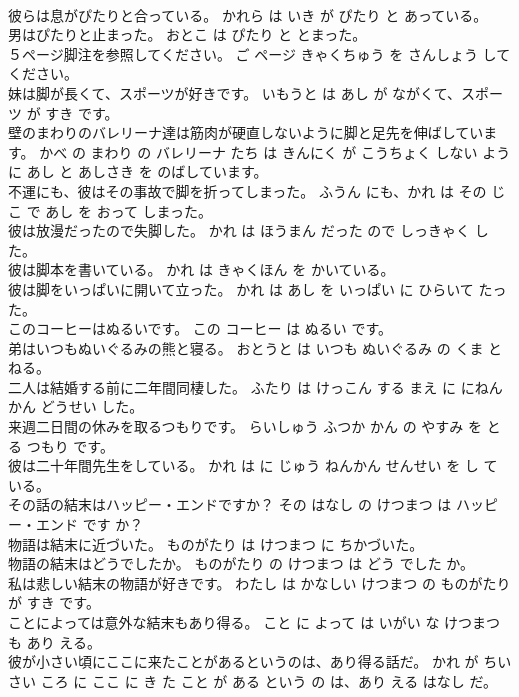 \documentclass[8pt]{extreport}
\begin{document}
\begin{CJK}{UTF8}{min}
\\	彼らは息がぴたりと合っている。	かれら は いき が ぴたり と あっている。	
\\	男はぴたりと止まった。	おとこ は ぴたり と とまった。	
\\	５ページ脚注を参照してください。	ご ページ きゃくちゅう を さんしょう して ください。	
\\	妹は脚が長くて、スポーツが好きです。	いもうと は あし が ながくて、スポーツ が すき です。	
\\	壁のまわりのバレリーナ達は筋肉が硬直しないように脚と足先を伸ばしています。	かべ の まわり の バレリーナ たち は きんにく が こうちょく しない よう に あし と あしさき を のばしています。	
\\	不運にも、彼はその事故で脚を折ってしまった。	ふうん にも、かれ は その じこ で あし を おって しまった。	
\\	彼は放漫だったので失脚した。	かれ は ほうまん だった ので しっきゃく した。	
\\	彼は脚本を書いている。	かれ は きゃくほん を かいている。	
\\	彼は脚をいっぱいに開いて立った。	かれ は あし を いっぱい に ひらいて たった。	
\\	このコーヒーはぬるいです。	この コーヒー は ぬるい です。	
\\	弟はいつもぬいぐるみの熊と寝る。	おとうと は いつも ぬいぐるみ の くま と ねる。	
\\	二人は結婚する前に二年間同棲した。	ふたり は けっこん する まえ に にねんかん どうせい した。	
\\	来週二日間の休みを取るつもりです。	らいしゅう ふつか かん の やすみ を とる つもり です。	
\\	彼は二十年間先生をしている。	かれ は に じゅう ねんかん せんせい を し て いる。	
\\	その話の結末はハッピー・エンドですか？	その はなし の けつまつ は ハッピー・エンド です か？	
\\	物語は結末に近づいた。	ものがたり は けつまつ に ちかづいた。	
\\	物語の結末はどうでしたか。	ものがたり の けつまつ は どう でした か。	
\\	私は悲しい結末の物語が好きです。	わたし は かなしい けつまつ の ものがたり が すき です。	
\\	ことによっては意外な結末もあり得る。	こと に よって は いがい な けつまつ も あり える。	
\\	彼が小さい頃にここに来たことがあるというのは、あり得る話だ。	かれ が ちいさい ころ に ここ に き た こと が ある という の は、あり える はなし だ。	

\end{CJK}
\end{document}
